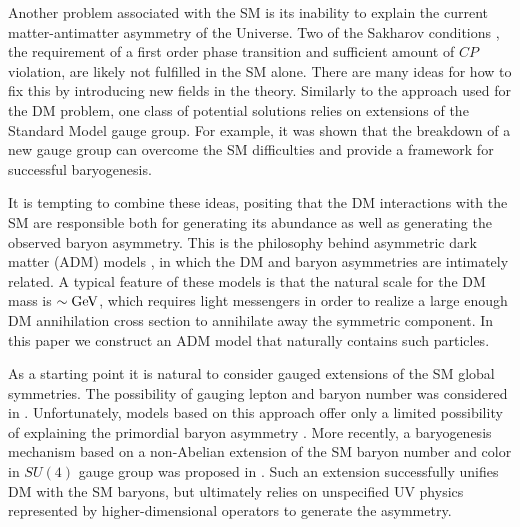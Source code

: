 \documentclass[prd,showpcs,amsmath,amssymb,nofootinbib,preprintnumbers,balancelastpage,longbibliography,superscriptaddress,notitlepage]{revtex4}
\begin{document}
Another problem associated with  the SM is its inability to explain the current matter-antimatter asymmetry of the Universe. Two of the Sakharov conditions \cite{Sakharov:1967dj}, the requirement of a first order phase transition and sufficient amount of $CP$ violation, are likely not fulfilled in the SM alone. There are many ideas for how to fix this by introducing new fields in the theory. Similarly to the approach used for the DM problem, one class of potential solutions relies on extensions of the Standard Model gauge group. For example, it was shown \cite{Shu:2006mm} that the breakdown of a new gauge group can overcome the SM difficulties and provide a framework for successful baryogenesis. 

It is tempting to combine these ideas, positing that the DM interactions with the SM are responsible both for generating its abundance as well as generating the observed baryon asymmetry.  This is the philosophy behind asymmetric dark matter (ADM) models \cite{Nussinov:1985xr,Kaplan:1991ah,Hooper:2004dc,Kaplan:2009ag,Petraki:2013wwa,Zurek:2013wia}, in which the DM and baryon asymmetries are intimately related.  A typical feature of these models is that the natural scale for the DM mass is $\sim  \rm GeV$, which requires light messengers in order to realize a large enough DM annihilation cross section to annihilate away the symmetric component. 
In this paper we construct an ADM model that naturally contains such particles.


As a starting point it is natural to consider gauged extensions of the SM global symmetries. The possibility of gauging lepton and baryon number was considered in \cite{Pais:1973mi, Tosa:1982pv, Rajpoot:1987yg, Foot:1989ts, Carone:1995pu, Georgi:1996ei}. Unfortunately, models based on this approach offer only a limited possibility of explaining the primordial baryon asymmetry \cite{FileviezPerez:2010gw,Duerr:2013dza,Schwaller:2013hqa}. More recently, a baryogenesis mechanism based on a non-Abelian extension of the SM baryon number and color in $SU(4)$ gauge group was proposed in \cite{Fornal:2015one,Fornal:2016boa}. Such an extension successfully unifies  DM with the SM baryons, but ultimately relies on unspecified UV physics represented by higher-dimensional operators to generate the asymmetry.
\end{document}
